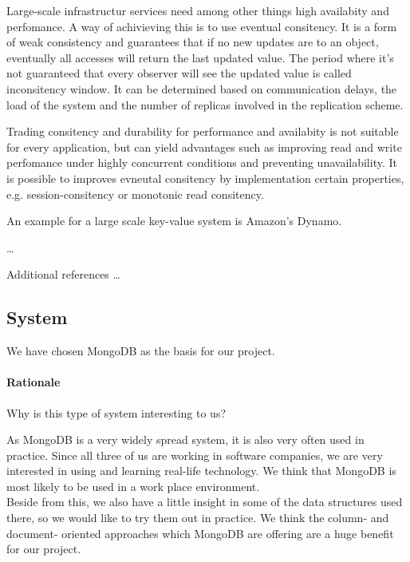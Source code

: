 \begin{packed_enum}
   \item 
   Large-scale infrastructur services need among other things high availabity and perfomance.
A way of achivieving this is to use eventual consitency. It is a form of weak consistency
and guarantees that if no new updates are to an object, eventually all accesses will return
the last updated value. The period where it's not guaranteed that every observer will see the
updated value is called inconsitency window. It can be determined based on communication delays,
the load of the system and the number of replicas involved in the replication scheme.
 
Trading consitency and durability for performance and availabity is not suitable for every
application, but can yield advantages such as improving read and write perfomance under highly concurrent
conditions and preventing unavailability. It is possible to improves evneutal consitency 
by implementation certain properties, e.g. session-consitency or monotonic read consitency.

An example for a large scale key-value system is Amazon's Dynamo.

   \item \ldots
   \item Additional references \ldots
\end{packed_enum}

\subsection{System}

We have chosen MongoDB as the basis for our project.

\paragraph{Rationale} Why is this type of system interesting to us? 

As MongoDB is a very widely spread system, it is also very often used in practice. Since all three of us are working in software companies, we are very interested in using and learning real-life technology. We think that MongoDB is most likely to be used in a work place environment. \\ 

Beside from this, we also have a little insight in some of the data structures used there, so we would like to try them out in practice. We think the column- and document- oriented approaches which MongoDB are offering are a huge benefit for our project.

